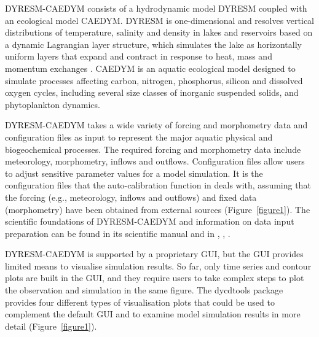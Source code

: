 DYRESM-CAEDYM consists of a hydrodynamic model DYRESM coupled with an ecological model CAEDYM. DYRESM is one-dimensional and resolves vertical distributions of temperature, salinity and density in lakes and reservoirs based on a dynamic Lagrangian layer structure, which simulates the lake as horizontally uniform layers that expand and contract in response to heat, mass and momentum exchanges \citep{gal2003simulating}. CAEDYM is an aquatic ecological model designed to simulate processes affecting carbon, nitrogen, phosphorus, silicon and dissolved oxygen cycles, including several size classes of inorganic suspended solids, and phytoplankton dynamics.\par

DYRESM-CAEDYM takes a wide variety of forcing and morphometry data and configuration files as input to represent the major aquatic physical and biogeochemical processes. The required forcing and morphometry data include meteorology, morphometry, inflows and outflows. Configuration files allow users to adjust sensitive parameter values for a model simulation. It is the configuration files that the auto-calibration function in  deals with, assuming that the forcing (e.g., meteorology, inflows and outflows) and fixed data (morphometry) have been obtained from external sources (Figure~\ref{figure1}). The scientific foundations of DYRESM-CAEDYM and information on data input preparation can be found in its scientific manual \citep{imerito2007dynamic} and in \citet{robson2004three}, \citet{romero2004one}, \citet{luo2018autocalibration}.\par

DYRESM-CAEDYM is supported by a proprietary GUI, but the GUI provides limited means to visualise simulation results. So far, only time series and contour plots are built in the GUI, and they require users to take complex steps to plot the observation and simulation in the same figure. The dycdtools package provides four different types of visualisation plots that could be used to complement the default GUI and to examine model simulation results in more detail (Figure~\ref{figure1}).\par

